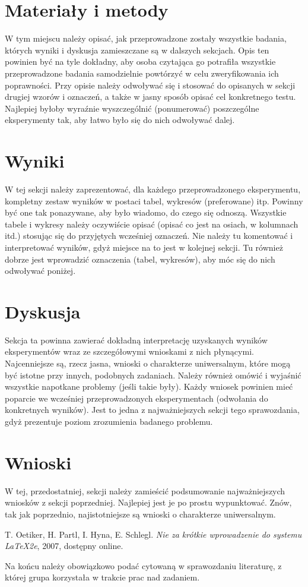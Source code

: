 \documentclass{classrep}
\begin{document}
\section{Materiały i metody}
{\color{blue}
W tym miejscu należy opisać, jak przeprowadzone zostały wszystkie badania,
których wyniki i dyskusja zamieszczane są w dalszych sekcjach. Opis ten
powinien być na tyle dokładny, aby osoba czytająca go potrafiła wszystkie
przeprowadzone badania samodzielnie powtórzyć w celu zweryfikowania ich
poprawności. Przy opisie należy odwoływać się i stosować do
opisanych w sekcji drugiej wzorów i oznaczeń, a także w jasny sposób opisać
cel konkretnego testu. Najlepiej byłoby wyraźnie wyszczególnić (ponumerować)
poszczególne eksperymenty tak, aby łatwo było się do nich odwoływać dalej.}

\section{Wyniki}
{\color{blue}
W tej sekcji należy zaprezentować, dla każdego przeprowadzonego eksperymentu,
kompletny zestaw wyników w postaci tabel, wykresów (preferowane) itp. Powinny
być one tak ponazywane, aby było wiadomo, do czego się odnoszą. Wszystkie
tabele i wykresy należy oczywiście opisać (opisać co jest na osiach, w
kolumnach itd.) stosując się do przyjętych wcześniej oznaczeń. Nie należy tu
komentować i interpretować wyników, gdyż miejsce na to jest w kolejnej sekcji.
Tu również dobrze jest wprowadzić oznaczenia (tabel, wykresów), aby móc się do
nich odwoływać poniżej.}

\section{Dyskusja}
{\color{blue}
Sekcja ta powinna zawierać dokładną interpretację uzyskanych wyników
eksperymentów wraz ze szczegółowymi wnioskami z nich płynącymi. Najcenniejsze
są, rzecz jasna, wnioski o charakterze uniwersalnym, które mogą być istotne
przy innych, podobnych zadaniach. Należy również omówić i wyjaśnić wszystkie
napotkane problemy (jeśli takie były). Każdy wniosek powinien mieć poparcie we
wcześniej przeprowadzonych eksperymentach (odwołania do konkretnych wyników).
Jest to jedna z najważniejszych sekcji tego sprawozdania, gdyż prezentuje
poziom zrozumienia badanego problemu.}

\section{Wnioski}
{\color{blue}
W tej, przedostatniej, sekcji należy zamieścić podsumowanie najważniejszych
wniosków z sekcji poprzedniej. Najlepiej jest je po prostu wypunktować. Znów,
tak jak poprzednio, najistotniejsze są wnioski o charakterze uniwersalnym.}

\begin{thebibliography}{0}
   T. Oetiker, H. Partl, I. Hyna, E. Schlegl.
    \textsl{Nie za krótkie wprowadzenie do systemu \LaTeX2e}, 2007, dostępny
    online.
\end{thebibliography}

{\color{blue}
Na końcu należy obowiązkowo podać cytowaną w sprawozdaniu literaturę, z której
grupa korzystała w trakcie prac nad zadaniem.}
\end{document}
